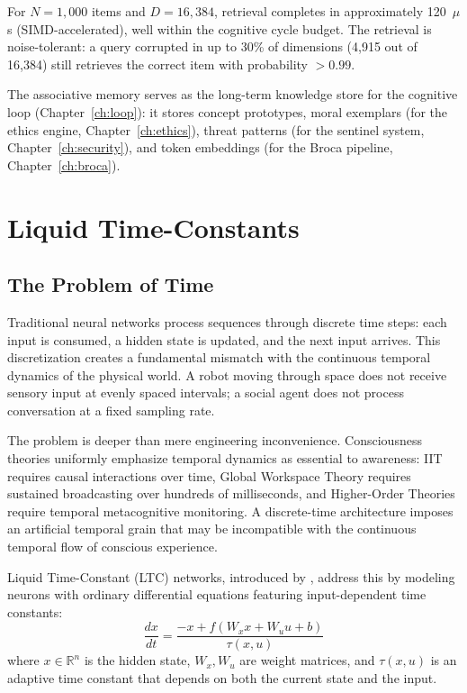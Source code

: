 \documentclass[12pt]{book}
\newcommand{\R}{\mathbb{R}}
\begin{document}
For $N = 1{,}000$ items and $D = 16{,}384$, retrieval completes in approximately 120~$\mu$s (SIMD-accelerated), well within the cognitive cycle budget. The retrieval is noise-tolerant: a query corrupted in up to 30\% of dimensions (4,915 out of 16,384) still retrieves the correct item with probability $> 0.99$.

The associative memory serves as the long-term knowledge store for the cognitive loop (Chapter~\ref{ch:loop}): it stores concept prototypes, moral exemplars (for the ethics engine, Chapter~\ref{ch:ethics}), threat patterns (for the sentinel system, Chapter~\ref{ch:security}), and token embeddings (for the Broca pipeline, Chapter~\ref{ch:broca}).


\chapter{Liquid Time-Constants}
\label{ch:ltc}

\section{The Problem of Time}

Traditional neural networks process sequences through discrete time steps: each input is consumed, a hidden state is updated, and the next input arrives. This discretization creates a fundamental mismatch with the continuous temporal dynamics of the physical world. A robot moving through space does not receive sensory input at evenly spaced intervals; a social agent does not process conversation at a fixed sampling rate.

The problem is deeper than mere engineering inconvenience. Consciousness theories uniformly emphasize temporal dynamics as essential to awareness: IIT requires causal interactions over time, Global Workspace Theory requires sustained broadcasting over hundreds of milliseconds, and Higher-Order Theories require temporal metacognitive monitoring. A discrete-time architecture imposes an artificial temporal grain that may be incompatible with the continuous temporal flow of conscious experience.

Liquid Time-Constant (LTC) networks, introduced by \citet{hasani2021liquid}, address this by modeling neurons with ordinary differential equations featuring input-dependent time constants:
\begin{equation}\label{eq:ltc}
\frac{dx}{dt} = \frac{-x + f(W_x x + W_u u + b)}{\tau(x, u)}
\end{equation}
where $x \in \R^n$ is the hidden state, $W_x, W_u$ are weight matrices, and $\tau(x, u)$ is an adaptive time constant that depends on both the current state and the input.
\end{document}

